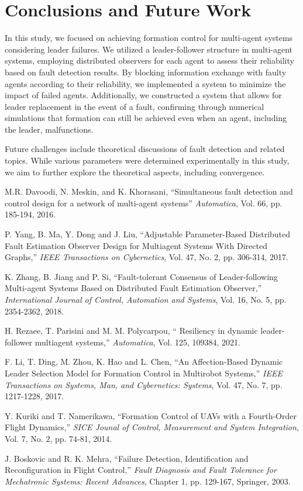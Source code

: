 \documentclass[a4paper,fleqn,10pt,twocolumn]{SICE_ISCS}
\begin{document}
\section{Conclusions and Future Work}
In this study, we focused on achieving formation control for multi-agent systems considering leader failures. We utilized a leader-follower structure in multi-agent systems, employing distributed observers for each agent to assess their reliability based on fault detection results. By blocking information exchange with faulty agents according to their reliability, we implemented a system to minimize the impact of failed agents. Additionally, we constructed a system that allows for leader replacement in the event of a fault, confirming through numerical simulations that formation can still be achieved even when an agent, including the leader,  malfunctions.

Future challenges include theoretical discussions of fault detection and related topics. While various parameters were determined experimentally in this study, we aim to further explore the theoretical aspects, including convergence.


\begin{thebibliography}{9}
M.R. Davoodi, N. Meskin, and K. Khorasani, ``Simultaneous fault detection and control design for a network of multi-agent systems'' {\it Automatica}, Vol. 66, pp. 185-194, 2016.

 P. Yang, B. Ma, Y. Dong and J. Liu, ``Adjustable Parameter-Based Distributed Fault Estimation Observer Design for Multiagent Systems With Directed Graphs,'' {\it IEEE Transactions on Cybernetics}, Vol. 47, No. 2, pp. 306-314, 2017.

 K. Zhang, B. Jiang and P. Si, ``Fault-tolerant Consensus of Leader-following Multi-agent Systems Based on Distributed Fault Estimation Observer,'' {\it International Journal of Control, Automation and Systems}, Vol. 16, No. 5, pp. 2354-2362, 2018.

H. Rezaee, T. Parisini and M. M. Polycarpou, `` Resiliency in dynamic leader-follower multiagent systems,'' {\it Automatica}, Vol. 125, 109384, 2021.     

F. Li, T. Ding, M. Zhou, K. Hao and L. Chen, ``An Affection-Based Dynamic Leader Selection Model for Formation Control in Multirobot Systems,'' {\it IEEE Transactions on Systems, Man, and Cybernetics: Systems}, Vol. 47, No. 7, pp. 1217-1228, 2017.

Y. Kuriki and T. Namerikawa, ``Formation Control of UAVs with a Fourth-Order Flight Dynamics,'' {\it SICE Jounal of Control, Measurement and System Integration}, Vol. 7, No. 2, pp. 74-81, 2014.

J. Boskovic and R. K. Mehra, ``Failure Detection, Identification and  Reconfiguration in Flight Control,'' {\it Fault Diagnosis and Fault Tolerance for Mechatronic Systems: Recent Advances}, Chapter 1, pp. 129-167, Springer, 2003.

\end{thebibliography}
\end{document}
